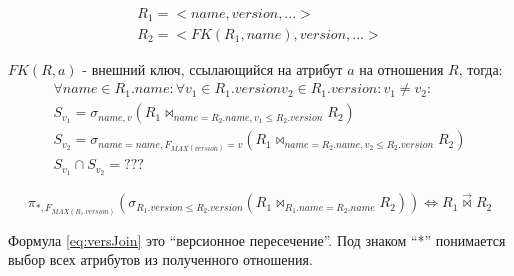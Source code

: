 \begin{multline*}
		R_1 = <name, version, ...>\\
		R_2 = <FK(R_1, name), version, ...>
\end{multline*}

\indent $FK(R, a)$ - внешний ключ, ссылающийся на атрибут $a$ на отношения $R$, тогда:
\begin{multline*}
	\forall name \in R_1.name : \forall v_1 \in R_1.version v_2 \in R_1.version: v_1 \neq v_2 : \\
		S_{v_1} = \sigma_{name, v}(R_1 \bowtie_{name = R_2.name, v_1 \leq R_2.version}R_2) \\
		S_{v_2} = \sigma_{name = name, F_{MAX(version)} = v}(R_1 \bowtie_{name = R_2.name, v_2 \leq R_2.version}R_2) \\
		S_{v_1} \cap S_{v_2} = ???
\end{multline*}


\begin{equation}
	\label{eq:versJoin}
	\pi_{*, F_{MAX(R_1.version)}}(\sigma_{R_1.version \leq R_2.version}(R_1 \bowtie_{R_1.name = R_2.name}R_2)) \Leftrightarrow R_1\overrightarrow{\bowtie} R_2
\end{equation}

\indent Формула \ref{eq:versJoin} это ``версионное пересечение''.
Под знаком ``*'' понимается выбор всех атрибутов из полученного отношения.

